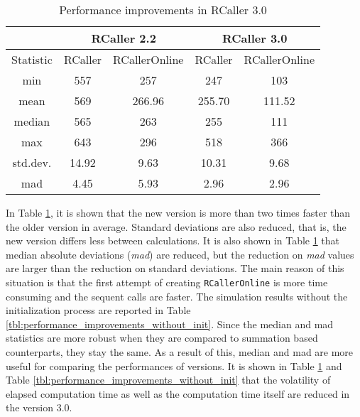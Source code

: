 \documentclass[10pt,a4paper, final, oneside]{article}
\begin{document}
\begin{table}[H]
\begin{center}
\caption{Performance improvements in RCaller 3.0}
\label{tbl:performance_improvements}
\begin{tabular}{|c|cc ||cc|}
\hline
          & \multicolumn{2}{c||}{RCaller 2.2}  &\multicolumn{2}{c|}{RCaller 3.0} \\
\hline
Statistic & RCaller & RCallerOnline & RCaller & RCallerOnline \\
\hline
min       & 557     & 257           & 247     & 103    \\
mean      & 569     & 266.96        & 255.70  & 111.52 \\
median    & 565     & 263           & 255     & 111    \\
max       & 643     & 296           & 518     & 366    \\
\hline
std.dev.  & 14.92   & 9.63          & 10.31   & 9.68   \\
mad       & 4.45    & 5.93          & 2.96    & 2.96   \\
\hline
\end{tabular}
\end{center}
\end{table}

In Table \ref{tbl:performance_improvements}, it is shown that the new version is more than two times faster
than the older version in average. Standard deviations are also reduced, that is, the new version differs less between calculations. It is also shown in Table \ref{tbl:performance_improvements} that median absolute deviations (\emph{mad}) are reduced, but the reduction on \emph{mad} values are larger than the reduction on standard deviations. The main reason of this situation is that the first attempt of creating \texttt{RCallerOnline} is more time consuming and the sequent calls are faster. The simulation results without the initialization process are reported in Table \ref{tbl:performance_improvements_without_init}. 
Since the median and mad statistics are more robust when they are compared to summation based counterparts, they stay the same. As a result of this, median and mad are more useful for comparing the performances of versions. It is shown in Table \ref{tbl:performance_improvements} and Table \ref{tbl:performance_improvements_without_init} that the volatility of elapsed computation time as well as the computation time itself are reduced in the version $3.0$. 
\end{document}
